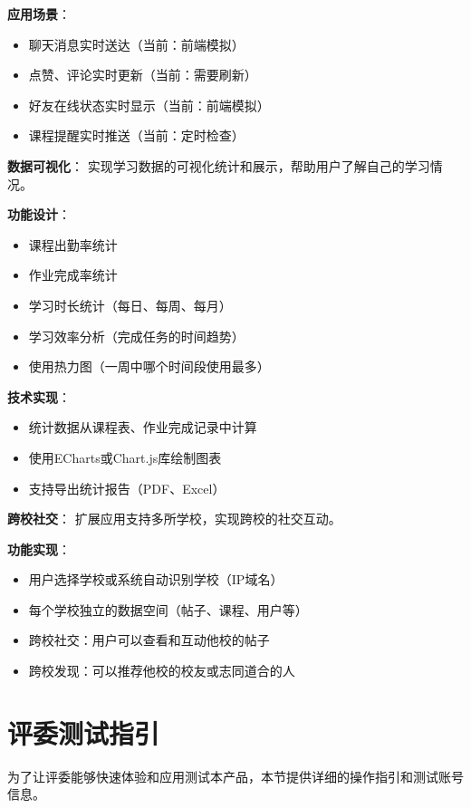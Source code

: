 \documentclass[12pt,a4paper]{article}
\begin{document}
\textbf{应用场景}：
\begin{itemize}
    \item 聊天消息实时送达（当前：前端模拟）
    \item 点赞、评论实时更新（当前：需要刷新）
    \item 好友在线状态实时显示（当前：前端模拟）
    \item 课程提醒实时推送（当前：定时检查）
\end{itemize}

\textbf{数据可视化}：
实现学习数据的可视化统计和展示，帮助用户了解自己的学习情况。

\textbf{功能设计}：
\begin{itemize}
    \item 课程出勤率统计
    \item 作业完成率统计
    \item 学习时长统计（每日、每周、每月）
    \item 学习效率分析（完成任务的时间趋势）
    \item 使用热力图（一周中哪个时间段使用最多）
\end{itemize}

\textbf{技术实现}：
\begin{itemize}
    \item 统计数据从课程表、作业完成记录中计算
    \item 使用ECharts或Chart.js库绘制图表
    \item 支持导出统计报告（PDF、Excel）
\end{itemize}

\textbf{跨校社交}：
扩展应用支持多所学校，实现跨校的社交互动。

\textbf{功能实现}：
\begin{itemize}
    \item 用户选择学校或系统自动识别学校（IP域名）
    \item 每个学校独立的数据空间（帖子、课程、用户等）
    \item 跨校社交：用户可以查看和互动他校的帖子
    \item 跨校发现：可以推荐他校的校友或志同道合的人
\end{itemize}

\section{评委测试指引}

为了让评委能够快速体验和应用测试本产品，本节提供详细的操作指引和测试账号信息。
\end{document}
